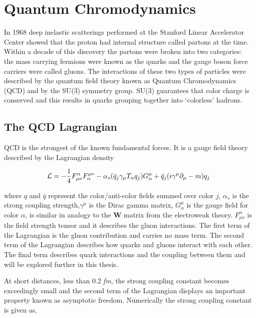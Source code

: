 
\chapter{Quantum Chromodynamics} \label{ch:qcd}
In 1968 deep inelastic scatterings performed at the Stanford Linear Accelerator Center showed that the proton had internal structure\cite{Riordan1287} called partons at the time.  Within a decade of this discovery the partons were broken into two categories: the mass carrying fermions were known as the quarks and the gauge boson force carriers were called gluons.  The interactions of these two types of particles were described by the quantum field theory known as Quantum Chromodynamics (QCD) and by the SU(3) symmetry group.  SU(3) guarantees that color charge is conserved and this results in quarks grouping together into `colorless' hadrons.

\section{The QCD Lagrangian}
QCD is the strongest of the known fundamental forces.  It is a gauge field theory described by the Lagrangian density

\begin{equation}
{\cal L}=-\frac{1}{4}F^{\alpha}_{\mu\nu}F^{\mu\nu}_{\alpha}
- \alpha_{s} (\bar{q}_{j}\gamma_{\mu}T_{\alpha}q_{j})G_{\alpha}^{\mu}
+ \bar{q}_{j}(i\gamma^{\mu} \partial_{\mu} - m)q_{j}
\label{eq:lagrangian}
\end{equation}

\noindent
where $q$ and $\bar{q}$ represent the color/anti-color fields summed over color $j$, $\alpha_{s}$ is the strong coupling strength,$\gamma^{\mu}$ is the Dirac gamma matrix, $G_{\alpha}^{\mu}$ is the gauge field for color \textit{$\alpha$}, is similar in analogy to the \textbf{W} matrix from the electroweak theory.  $F^{\alpha}_{\mu\nu}$ is the field strength tensor and it describes the gluon interactions. The first term of the Lagrangian is the gluon contribution and carries no mass term.  The second term of the Lagrangian describes how quarks and gluons interact with each other. The final term describes quark interactions and the coupling between them and will be explored further in this thesis.

At short distances, less than 0.2 \textit{fm}, the strong coupling constant becomes exceedingly small and the second term of the Lagrangian displays an important property known as asymptotic freedom\cite{Wilczek:2005az}.  Numerically the strong coupling constant is given as,

